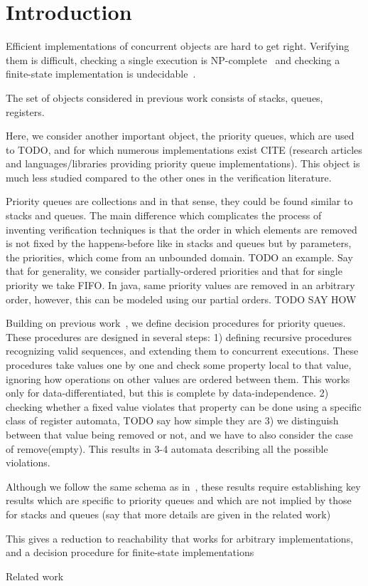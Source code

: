 \section{Introduction}
\label{sec:introduction}

Efficient implementations of concurrent objects are hard to get right. Verifying them is difficult, checking a single execution is NP-complete~\cite{journals/siamcomp/GibbonsK97} and checking a finite-state implementation is undecidable~\cite{conf/esop/BouajjaniEEH13}.

The set of objects considered in previous work consists of stacks, queues, registers.

Here, we consider another important object, the priority queues, which are used to TODO, and for which numerous implementations exist CITE (research articles and languages/libraries providing priority queue implementations). This object is much less studied compared to the other ones in the verification literature.

Priority queues are collections and in that sense, they could be found similar to stacks and queues. The main difference which complicates the process of inventing verification techniques is that the order in which elements are removed is not fixed by the happens-before like in stacks and queues but by parameters, the priorities, which come from an unbounded domain. TODO an example. Say that for generality, we consider partially-ordered priorities and that for single priority we take FIFO. In java, same priority values are removed in an arbitrary order, however, this can be modeled using our partial orders. TODO SAY HOW

Building on previous work~\cite{DBLP:conf/icalp/BouajjaniEEH15}, we define decision procedures for priority queues. These procedures are designed in several steps:
1) defining recursive procedures recognizing valid sequences, and extending them to concurrent executions. These procedures take values one by one and check some property local to that value, ignoring how operations on other values are ordered between them. This works only for data-differentiated, but this is complete by data-independence.
2) checking whether a fixed value violates that property can be done using a specific class of register automata, TODO say how simple they are
3) we distinguish between that value being removed or not, and we have to also consider the case of remove(empty). This results in 3-4 automata describing all the possible violations.

Although we follow the same schema as in~\cite{DBLP:conf/icalp/BouajjaniEEH15}, these results require establishing key results which are specific to priority queues and which are not implied by those for stacks and queues (say that more details are given in the related work)

This gives a reduction to reachability that works for arbitrary implementations, and a decision procedure for finite-state implementations




\smallskip

\noindent Related work



